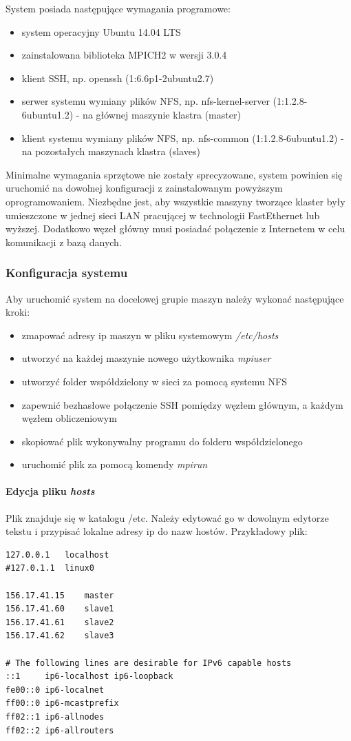\documentclass{article}
\begin{document}
System posiada następujące wymagania programowe:
\begin{itemize}
\item system operacyjny Ubuntu 14.04 LTS
\item zainstalowana biblioteka MPICH2 w wersji 3.0.4
\item klient SSH, np. openssh (1:6.6p1-2ubuntu2.7)
\item serwer systemu wymiany plików NFS, np. nfs-kernel-server (1:1.2.8-6ubuntu1.2) - na głównej maszynie klastra (master)
\item klient systemu wymiany plików NFS, np. nfs-common (1:1.2.8-6ubuntu1.2) - na pozostałych maszynach klastra (slaves)
\end{itemize}
 
Minimalne wymagania sprzętowe nie zostały sprecyzowane, system powinien się uruchomić na dowolnej konfiguracji z zainstalowanym powyższym oprogramowaniem. Niezbędne jest, aby wszystkie maszyny tworzące klaster były umieszczone w jednej sieci LAN pracującej w technologii FastEthernet lub wyższej. Dodatkowo węzeł główny musi posiadać połączenie z Internetem w celu komunikacji z bazą danych.

\subsubsection{Konfiguracja systemu}
Aby uruchomić system na docelowej grupie maszyn należy wykonać następujące kroki:
\begin{itemize}
\item zmapować adresy ip maszyn w pliku systemowym \textit{/etc/hosts}
\item utworzyć na każdej maszynie nowego użytkownika \textit{mpiuser}
\item utworzyć folder współdzielony w sieci za pomocą systemu NFS
\item zapewnić bezhasłowe połączenie SSH pomiędzy węzłem głównym, a każdym węzłem obliczeniowym
\item skopiować plik wykonywalny programu do folderu współdzielonego
\item uruchomić plik za pomocą komendy \textit{mpirun}
\end{itemize}
\newpage
\paragraph{Edycja pliku \textit{hosts}}

Plik znajduje się w katalogu /etc. Należy edytować go w dowolnym edytorze tekstu i przypisać lokalne adresy ip do nazw hostów. Przykładowy plik:
\begin{lstlisting}
127.0.0.1	localhost
#127.0.1.1	linux0

156.17.41.15	master
156.17.41.60	slave1
156.17.41.61	slave2
156.17.41.62	slave3

# The following lines are desirable for IPv6 capable hosts
::1     ip6-localhost ip6-loopback
fe00::0 ip6-localnet
ff00::0 ip6-mcastprefix
ff02::1 ip6-allnodes
ff02::2 ip6-allrouters
\end{lstlisting}
\end{document}

